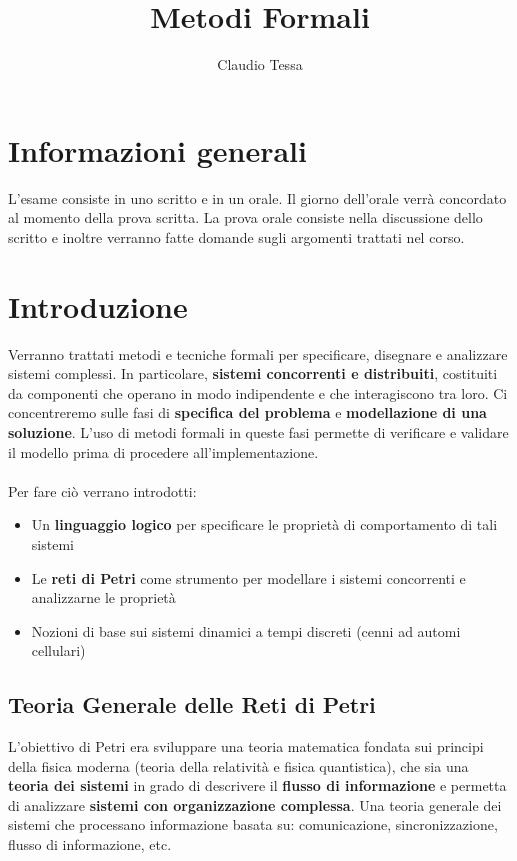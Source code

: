 \documentclass[12pt, a4paper]{article}
\title{Metodi Formali}
\author{Claudio Tessa}
\date{\the\year}
\begin{document}
\maketitle

\section*{Informazioni generali}
L'esame consiste in uno scritto e in un orale. Il giorno dell'orale verrà concordato al momento della prova scritta. La prova orale consiste nella discussione dello scritto e inoltre verranno fatte domande sugli argomenti trattati nel corso.

\tableofcontents
\newpage


\section{Introduzione}

Verranno trattati metodi e tecniche formali per specificare, disegnare e analizzare sistemi complessi. In particolare, \textbf{sistemi concorrenti e distribuiti}, costituiti da componenti che operano in modo indipendente e che interagiscono tra loro. Ci concentreremo sulle fasi di \textbf{specifica del problema} e \textbf{modellazione di una soluzione}. L'uso di metodi formali in queste fasi permette di verificare e validare il modello prima di procedere all'implementazione.
\\
\\
Per fare ciò verrano introdotti:
\begin{itemize}
    \item Un \textbf{linguaggio logico} per specificare le proprietà di comportamento di tali sistemi
    \item Le \textbf{reti di Petri} come strumento per modellare i sistemi concorrenti e analizzarne le proprietà    
    \item Nozioni di base sui sistemi dinamici a tempi discreti (cenni ad automi cellulari)
\end{itemize}

\subsection{Teoria Generale delle Reti di Petri}

L'obiettivo di Petri era sviluppare una teoria matematica fondata sui principi della fisica moderna (teoria della relatività e fisica quantistica), che sia una \textbf{teoria dei sistemi} in grado di descrivere il \textbf{flusso di informazione} e permetta di analizzare \textbf{sistemi con organizzazione complessa}. Una teoria generale dei sistemi che processano informazione basata su: comunicazione, sincronizzazione, flusso di informazione, etc.

\end{document}
